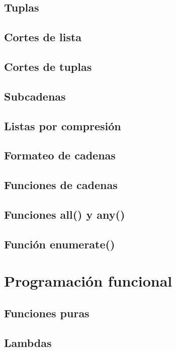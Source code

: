 \documentclass{report}
\begin{document}
\section{Tuplas}

\section{Cortes de lista}

\section{Cortes de tuplas}

\section{Subcadenas}

\section{Listas por compresión}

\section{Formateo de cadenas}

\section{Funciones de cadenas}

\section{Funciones all() y any()}

\section{Función enumerate()}

\clearpage\chapter{Programación funcional}

\section{Funciones puras}

\section{Lambdas}
\end{document}
